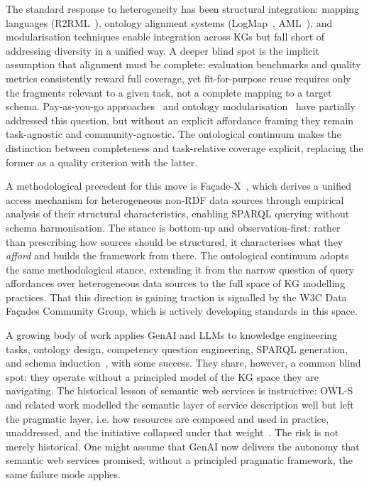 \documentclass[runningheads]{llncs}
\newcommand{\add}[1]{\textcolor{addedcolor}{#1}}
\begin{document}
\add{The standard response to heterogeneity has been structural integration:
mapping languages (R2RML~\cite{das2012r2rml}), ontology
alignment systems (LogMap~\cite{logma_ecai2012}, AML~\cite{aml}), and
modularisation techniques enable integration across KGs but fall short
of addressing diversity in a unified way. A deeper blind spot is the
implicit assumption that alignment must be complete: evaluation
benchmarks and quality metrics consistently reward full coverage, yet
fit-for-purpose reuse requires only the fragments relevant to a given
task, not a complete mapping to a target schema. Pay-as-you-go
approaches~\cite{Sequeda2019pay} and ontology modularisation~\cite{LeClair2022modularization}
have partially addressed this question, but without an explicit
affordance framing they remain task-agnostic and community-agnostic.
The ontological continuum makes the distinction between completeness and
task-relative coverage explicit, replacing the former as a quality
criterion with the latter.}

\add{A methodological precedent for this move is Fa\c{c}ade-X~\cite{asprino2023knowledge},
which derives a unified access mechanism for heterogeneous non-RDF data
sources through empirical analysis of their structural characteristics,
enabling SPARQL querying without schema harmonisation. The stance is
bottom-up and observation-first: rather than prescribing how sources
should be structured, it characterises what they \emph{afford} and builds the
framework from there. The ontological continuum adopts the same
methodological stance, extending it from the narrow question of query
affordances over heterogeneous data sources to the full space of KG
modelling practices. That this direction is gaining traction is signalled
by the W3C Data Fa\c{c}ades Community Group, which is actively
developing standards in this space.}

\add{A growing body of work applies GenAI and LLMs to knowledge engineering
tasks, ontology design, competency question engineering, SPARQL
generation, and schema induction~\cite{garijo2024llms}, with some success. They share, however, a common blind spot: they
operate without a principled model of the KG space they are navigating.
The historical lesson of semantic web services is instructive: OWL-S and
related work modelled the semantic layer of service description well but
left the pragmatic layer, i.e. how resources are composed and used in
practice, unaddressed, and the initiative collapsed under that
weight~\cite{owls,wsmo}. The risk is not merely historical. One might
assume that GenAI now delivers the autonomy that semantic web services
promised; without a principled pragmatic framework, the same failure
mode applies.}
\end{document}
